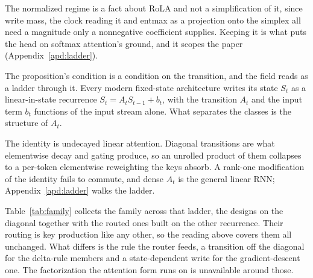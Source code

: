 The normalized regime is a fact about RoLA and not a simplification of it, since write mass, the clock reading it and entmax as a projection onto the simplex all need a magnitude only a nonnegative coefficient supplies. Keeping it is what puts the head on softmax attention's ground, and it scopes the paper (Appendix~\ref{apd:ladder}).

The proposition's condition is a condition on the transition, and the field reads as a ladder through it. Every modern fixed-state architecture writes its state $S_t$ as a linear-in-state recurrence $S_t = A_t S_{t-1} + b_t$, with the transition $A_t$ and the input term $b_t$ functions of the input stream alone. What separates the classes is the structure of $A_t$.

The identity is undecayed linear attention. Diagonal transitions are what elementwise decay and gating produce, so an unrolled product of them collapses to a per-token elementwise reweighting the keys absorb. A rank-one modification of the identity fails to commute, and dense $A_t$ is the general linear RNN; Appendix~\ref{apd:ladder} walks the ladder.


Table~\ref{tab:family} collects the family across that ladder, the designs on the diagonal together with the routed ones built on the other recurrence. Their routing is key production like any other, so the reading above covers them all unchanged. What differs is the rule the router feeds, a transition off the diagonal for the delta-rule members and a state-dependent write for the gradient-descent one. The factorization the attention form runs on is unavailable around those.



